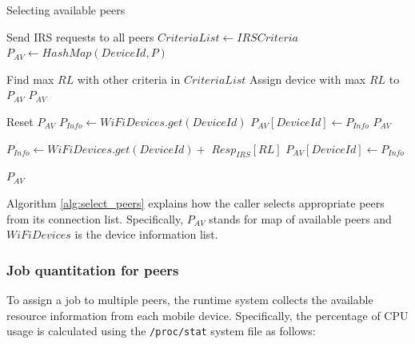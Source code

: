 \documentclass{sig-alternate}[10pt]
\begin{document}
\begin{algorithm}

\caption{Selecting available peers}
\label{alg:select_peers}
\begin{algorithmic}[1] 
\begin{scriptsize}
\State Send IRS requests to all peers 
\State $CriteriaList \leftarrow IRSCriteria$
\State $P_{AV} \leftarrow HashMap(DeviceId, P)$

  	\State Find max $RL$ with other criteria in $CriteriaList$
		\State Assign device with max $RL$ to $P_{AV}$
  	\State \Return $P_{AV}$
  \EndFor
\EndIf

  	\State Reset $P_{AV}$ 
  	\State $P_{Info} \leftarrow WiFiDevices.get(DeviceId)$
  	\State $P_{AV}[DeviceId] \leftarrow P_{Info}$
  	\State \Return $P_{AV}$
  \EndIf

  	\State $P_{Info} \leftarrow WiFiDevices.get(DeviceId) + $
		\State
			\hspace{\algorithmicindent}
			\hspace{\algorithmicindent}
			\hspace{\algorithmicindent}
			\hspace{\algorithmicindent}
			$Resp_{IRS}[RL]$
  	\State $P_{AV}[DeviceId] \leftarrow P_{Info}$
  \EndIf
\EndFor

\State \Return $P_{AV}$
\EndFunction
\end{scriptsize}
\end{algorithmic}

\end{algorithm}

Algorithm \ref{alg:select_peers} explains how the caller selects appropriate peers from its connection list. Specifically, $P_{AV}$ stands for map of available peers and $WiFiDevices$ is the device information list.\\

\subsubsection{Job quantitation for peers}\label{ss_jqfp}
To assign a job to multiple peers, the runtime system collects the available resource information from each mobile device. Specifically, the percentage of CPU usage is calculated using the \texttt{/proc/stat} system file as follows:
\end{document}
